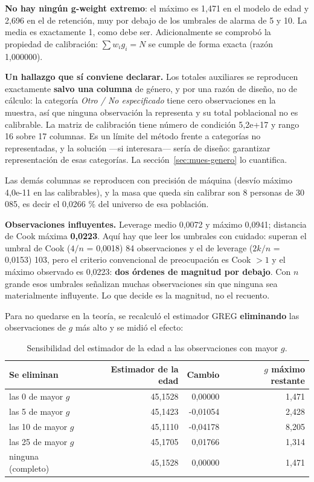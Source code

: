 \textbf{No hay ningún g-weight extremo}: el máximo es 1,471 en el modelo de edad y
2,696 en el de retención, muy por debajo de los umbrales de alarma de 5 y 10. La
media es exactamente 1, como debe ser. Adicionalmente se comprobó la propiedad de
calibración: $\sum w_i g_i = N$ se cumple de forma exacta (razón 1,000000).

\textbf{Un hallazgo que sí conviene declarar.} Los totales auxiliares se
reproducen exactamente \textbf{salvo una columna} de género, y por una razón de
diseño, no de cálculo: la categoría \emph{Otro / No especificado} tiene cero
observaciones en la muestra, así que ninguna observación la representa y su total
poblacional no es calibrable. La matriz de calibración tiene número de condición
5,2e+17 y rango 16 sobre 17 columnas. Es un límite del método frente a categorías
no representadas, y la solución ---si interesara--- sería de diseño: garantizar
representación de esas categorías. La sección~\ref{sec:mues-genero} lo
cuantifica.

Las demás columnas se reproducen con precisión de máquina (desvío máximo 4,0e-11
en las calibrables), y la masa que queda sin calibrar son 8 personas de 30 085,
es decir el 0,0266 \% del universo de esa población.

\textbf{Observaciones influyentes.} Leverage medio 0,0072 y máximo 0,0941;
distancia de Cook máxima \textbf{0,0223}. Aquí hay que leer los umbrales con
cuidado: superan el umbral de Cook ($4/n$ = 0,0018) 84 observaciones y el de
leverage ($2k/n$ = 0,0153) 103, pero el criterio convencional de preocupación es
Cook $> 1$ y el máximo observado es 0,0223: \textbf{dos órdenes de magnitud por
debajo}. Con $n$ grande esos umbrales señalizan muchas observaciones sin que
ninguna sea materialmente influyente. Lo que decide es la magnitud, no el
recuento.

Para no quedarse en la teoría, se recalculó el estimador GREG
\textbf{eliminando} las observaciones de $g$ más alto y se midió el efecto:

\begin{table}[H]
  \centering
  \small
  \caption{Sensibilidad del estimador de la edad a las observaciones con mayor $g$.}
  \label{tab:mues-sensibilidad}
  \begin{tabular}{@{}lrrr@{}}
    \toprule
    \textbf{Se eliminan} & \textbf{Estimador de la edad} & \textbf{Cambio}
      & \textbf{$g$ máximo restante} \\
    \midrule
    las 0 de mayor $g$ & 45,1528 & 0,00000 & 1,471 \\
    las 5 de mayor $g$ & 45,1423 & -0,01054 & 2,428 \\
    las 10 de mayor $g$ & 45,1110 & -0,04178 & 8,205 \\
    las 25 de mayor $g$ & 45,1705 & 0,01766 & 1,314 \\
    ninguna (completo) & 45,1528 & 0,00000 & 1,471 \\
    \bottomrule
  \end{tabular}
\end{table}

